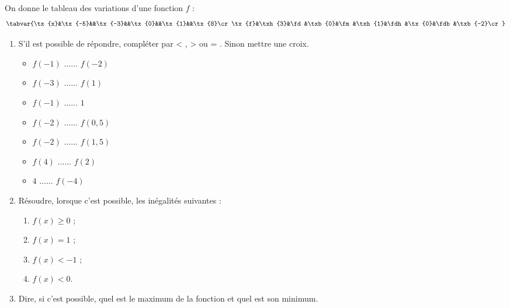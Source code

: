 \begin{multicols}{2}
\begin{exo}
On donne le tableau des variations d'une fonction $f$ :$$\tabvar{%
\tx{x}&\tx{-5}&&\tx{-3}&&\tx{0}&&\tx{1}&&\tx{8}\cr
\tx{f}&\txh{3}&\fd&\txb{0}&\fm&\txh{1}&\fdh&\tx{0}&\fdb&\txb{-2}\cr
}$$
\begin{enumerate}
	\item S'il est possible de r\'epondre, compl\'eter par \og < \fg, \og > \fg{} ou \og = \fg. Sinon mettre une croix.
\begin{itemize}
 \item $f(-1)$  $\ldots\ldots$  $f(-2)$ 
 \item $f(-3)$  $\ldots\ldots$  $f(1)$ 
 \item $f(-1)$  $\ldots\ldots$  $1$ 
 \item $f(-2)$ $\ldots\ldots$  $f(0,5)$
 \item $f(-2)$  $\ldots\ldots$  $f(1,5)$
 \item $f(4)$  $\ldots\ldots$  $f(2)$
 \item $4$  $\ldots\ldots$ $f(-4)$
 \end{itemize}

\item R\'esoudre, lorsque c'est possible, les in\'egalit\'es suivantes :
\vspace{-1em}\begin{multicols}{2}\begin{enumerate}
	  \item $f(x)\geqslant 0$ ;
	  \item $f(x)=1$ ;
	  \item $f(x)<-1$ ;
	  \item $f(x)<0$.
  \end{enumerate}\end{multicols}
	\item Dire, si c'est possible, quel est le maximum de la fonction et quel est son minimum.
\end{enumerate}%
\end{exo}
\end{multicols}



